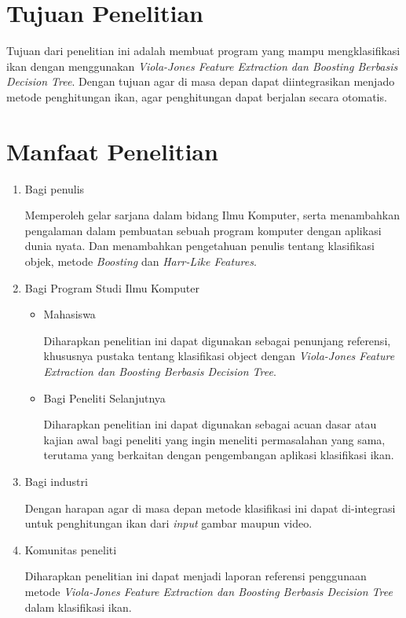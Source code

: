 \section{Tujuan Penelitian}
	Tujuan dari penelitian ini adalah membuat program yang mampu
	mengklasifikasi ikan dengan menggunakan \textit{Viola-Jones Feature Extraction dan Boosting Berbasis 
	Decision Tree}. Dengan tujuan agar di masa depan dapat diintegrasikan 
	menjado metode penghitungan ikan, agar penghitungan dapat berjalan 
	secara otomatis.

\section{Manfaat Penelitian}
\begin{enumerate}
	\item Bagi penulis
		
	Memperoleh gelar sarjana dalam bidang Ilmu Komputer, serta menambahkan 
	pengalaman dalam pembuatan sebuah program komputer dengan aplikasi dunia 
	nyata. Dan menambahkan pengetahuan penulis tentang klasifikasi objek, metode 
	\textit{Boosting} dan \textit{Harr-Like Features}.
		
	\item Bagi Program Studi Ilmu Komputer
	
	\begin{itemize}
		\item Mahasiswa
		
		Diharapkan penelitian ini dapat digunakan sebagai penunjang referensi, 
		khususnya pustaka tentang klasifikasi object dengan 
		\textit{Viola-Jones Feature Extraction dan Boosting Berbasis 
		Decision Tree}.

		\item Bagi Peneliti Selanjutnya
		
		Diharapkan penelitian ini dapat digunakan sebagai acuan dasar atau kajian 
		awal bagi peneliti yang ingin meneliti permasalahan yang sama, terutama 
		yang berkaitan dengan pengembangan aplikasi klasifikasi ikan.

	\end{itemize}

	\item Bagi industri
	
	Dengan harapan agar di masa depan metode klasifikasi ini dapat di-integrasi 
	untuk penghitungan ikan dari \textit{input} gambar maupun video.

	\item Komunitas peneliti
	
	Diharapkan penelitian ini dapat menjadi laporan 
	referensi penggunaan metode \textit{Viola-Jones Feature Extraction dan Boosting Berbasis 
	Decision Tree} dalam klasifikasi ikan.



			
\end{enumerate}

\begin{comment}

\end{comment}
